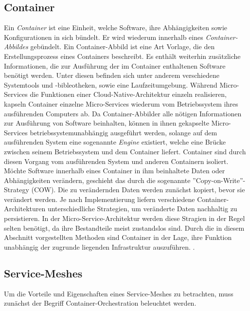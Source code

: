 \subsection{Container}

Ein \textit{Container} ist eine Einheit, welche Software, ihre Abhängigkeiten sowie Konfigurationen in sich bündelt. Er wird wiederum innerhalb eines \textit{Container-Abbildes} gebündelt. Ein Container-Abbild ist eine Art Vorlage, die den Erstellungsprozess eines Containers beschreibt. Es enthält weiterhin zusätzliche Informationen, die zur Ausführung der im Container enthaltenen Software benötigt werden. Unter diesen befinden sich unter anderem verschiedene Systemtools und -bibleotheken, sowie eine Laufzeitumgebung. Während Micro-Services die Funktionen einer Cloud-Native-Architektur einzeln realisieren, kapseln Container einzelne Micro-Services wiederum vom Betriebssystem ihres ausführenden Computers ab. Da Container-Abbilder alle nötigen Informationen zur Ausführung von Software beinhalten, können in ihnen gekapselte Micro-Services betriebssystemunabhängig ausgeführt werden, solange auf dem ausführenden System eine sogenannte \textit{Engine} existiert, welche eine Brücke zwischen seinem Betriebssystem und dem Container liefert. Container sind durch diesen Vorgang vom ausführenden System und anderen Containern isoliert. Möchte Software innerhalb eines Container in ihm beinhaltete Daten oder Abhängigkeiten verändern, geschieht das durch die sogenannte ''Copy-on-Write''-Strategy (COW). Die zu verändernden Daten werden zunächst kopiert, bevor sie verändert werden. Je nach Implementierung liefern verschiedene Container-Architekturen unterschiedliche Strategien, um veränderte Daten nachhaltig zu persistieren. In der Micro-Service-Architektur werden diese Stragien in der Regel selten benötigt, da ihre Bestandteile meist zustandslos sind. Durch die in diesem Abschnitt vorgestellten Methoden sind Container in der Lage, ihre Funktion unabhängig der zugrunde liegenden Infrastruktur auszuführen. \cite{docker_what_nodate}. 

\subsection{Service-Meshes}
Um die Vorteile und Eigenschaften eines Service-Meshes zu betrachten, muss zunächst der Begriff Container-Orchestration beleuchtet werden.
